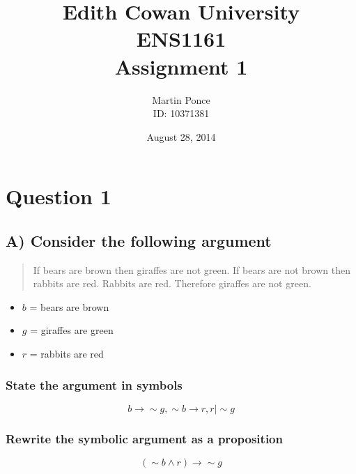 \documentclass[12pt,a4paper]{article}
\title{Edith Cowan University\\ENS1161\\Assignment 1}
\author{Martin Ponce\\ID: 10371381}
\date{August 28, 2014}
\begin{document}


\newpage
\null  %
\nointerlineskip  %
\vfill
\let\snewpage \newpage
\let\newpage \relax
\maketitle
\thispagestyle{empty}
\let \newpage \snewpage
\vfill

\newpage
\tableofcontents

\newpage
\section{Question 1}

\subsection{A) Consider the following argument}
\begin{quote}
If bears are brown then giraffes are not green. If bears are not brown then rabbits are red. Rabbits are red. Therefore giraffes are not green.
\end{quote}

\begin{itemize}
\item $b$ = bears are brown
\item $g$ = giraffes are green
\item $r$ = rabbits are red
\end{itemize}

\subsubsection{State the argument in symbols}
$$b \rightarrow \sim{g}, \sim{b} \rightarrow r, r \mid \sim{g}$$

\subsubsection{Rewrite the symbolic argument as a proposition}
$$(\sim{b} \wedge r) \rightarrow \sim{g}$$
\end{document}
